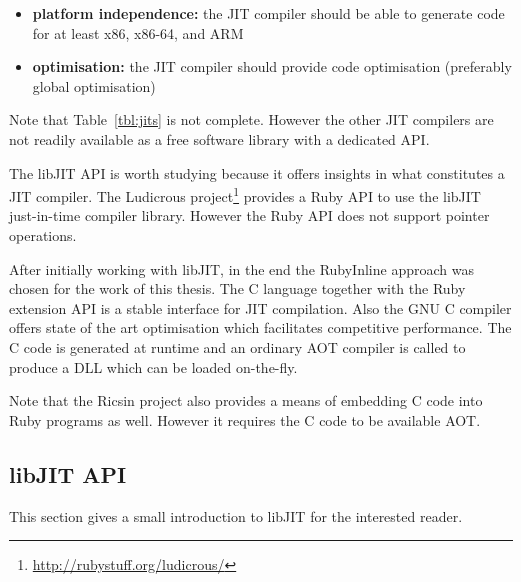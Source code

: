 \documentclass[12pt,a4paper,oneside,openright]{book}
\newcommand{\tbl}[1]{Table~\ref{tbl:#1}}
\begin{document}
\begin{CJK}{UTF8}{}
\begin{itemize}
\item \textbf{platform independence:} the \ac{JIT} compiler should be able to generate code for at least x86, x86-64, and ARM
\item \textbf{optimisation:} the \ac{JIT} compiler should provide code optimisation (preferably global optimisation)
\end{itemize}
Note that \tbl{jits} is not complete. However the other \ac{JIT} compilers are not readily available as a free software library with a dedicated \ac{API}.

The libJIT API is worth studying because it offers insights in what constitutes a \ac{JIT} compiler. The Ludicrous project\footnote{\url{http://rubystuff.org/ludicrous/}} provides a Ruby \ac{API} to use the libJIT just-in-time compiler library. However the Ruby \ac{API} does not support pointer operations.

After initially working with libJIT, in the end the RubyInline approach was chosen for the work of this thesis.  The C language together with the Ruby extension API is a stable interface for \ac{JIT} compilation. Also the GNU C compiler offers state of the art optimisation which facilitates competitive performance. The C code is generated at runtime and an ordinary \ac{AOT} compiler is called to produce a \ac{DLL} which can be loaded on-the-fly.

Note that the Ricsin project \citep{ricsin1,ricsin2} also provides a means of embedding C code into Ruby programs as well. However it requires the C code to be available \ac{AOT}.

\subsection{libJIT \acs{API}}
This section gives a small introduction to libJIT for the interested reader.


\end{CJK}
\end{document}

